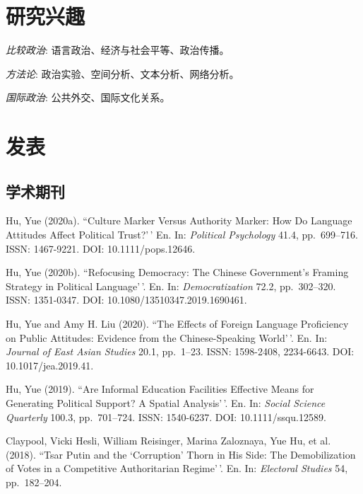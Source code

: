 \documentclass[10.5pt,]{article}
\providecommand{\tightlist}{%
	\setlength{\itemsep}{0pt}\setlength{\parskip}{0pt}}
\renewenvironment{itemize}{
	\begin{list}{}{
			\setlength{\leftmargin}{1.5em}
		}
	}{
	\end{list}
}
\begin{document}
 \hypertarget{ux7814ux7a76ux5174ux8da3}{%
 \section{研究兴趣}\label{ux7814ux7a76ux5174ux8da3}}

 \begin{itemize}
 \tightlist
 \item
   \emph{比较政治}: 语言政治、经济与社会平等、政治传播。
 \item
   \emph{方法论}: 政治实验、空间分析、文本分析、网络分析。
 \item
   \emph{国际政治}: 公共外交、国际文化关系。
 \end{itemize}

 \hypertarget{ux53d1ux8868}{%
 \section{发表}\label{ux53d1ux8868}}

 \hypertarget{ux5b66ux672fux671fux520a}{%
 \subsection{学术期刊}\label{ux5b66ux672fux671fux520a}}

 Hu, Yue (2020a). ``Culture Marker Versus Authority Marker: How Do
 Language Attitudes Affect Political Trust?'\,' En. In:
 \emph{Political Psychology} 41.4, pp.~699--716. ISSN: 1467-9221. DOI:
 10.1111/pops.12646.

 Hu, Yue (2020b). ``Refocusing Democracy: The Chinese Government's
 Framing Strategy in Political Language'\,'. En. In:
 \emph{Democratization} 72.2, pp.~302--320. ISSN: 1351-0347. DOI:
 10.1080/13510347.2019.1690461.

 Hu, Yue and Amy H. Liu (2020). ``The Effects of Foreign Language
 Proficiency on Public Attitudes: Evidence from the Chinese-Speaking
 World'\,'. En. In: \emph{Journal of East Asian Studies} 20.1,
 pp.~1--23. ISSN: 1598-2408, 2234-6643. DOI: 10.1017/jea.2019.41.

 Hu, Yue (2019). ``Are Informal Education Facilities Effective Means for
 Generating Political Support? A Spatial Analysis'\,'. En. In:
 \emph{Social Science Quarterly} 100.3, pp.~701--724. ISSN: 1540-6237.
 DOI: 10.1111/ssqu.12589.

 Claypool, Vicki Hesli, William Reisinger, Marina Zaloznaya, Yue Hu, et
 al. (2018). ``Tsar Putin and the `Corruption' Thorn in His Side: The
 Demobilization of Votes in a Competitive Authoritarian Regime'\,'. En.
 In: \emph{Electoral Studies} 54, pp.~182--204.
\end{document}
